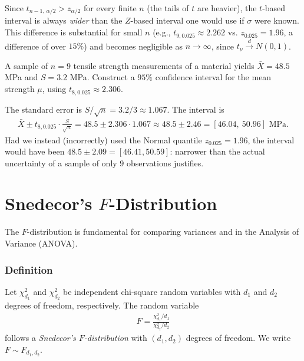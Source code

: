 \begin{observacion}
Since $t_{n-1,\,\alpha/2} > z_{\alpha/2}$ for every finite $n$ (the tails of $t$ are heavier), the $t$-based interval is always \emph{wider} than the $Z$-based interval one would use if $\sigma$ were known. This difference is substantial for small $n$ (e.g., $t_{9,0.025}\approx 2.262$ vs. $z_{0.025}=1.96$, a difference of over $15\%$) and becomes negligible as $n \to \infty$, since $t_\nu \xrightarrow{d} N(0,1)$.
\end{observacion}

\begin{ejemplo}
 \label{exmp:5.4.1}
A sample of $n=9$ tensile strength measurements of a material yields $\bar{X}=48.5$ MPa and $S=3.2$ MPa. Construct a $95\%$ confidence interval for the mean strength $\mu$, using $t_{8,0.025}\approx 2.306$.
\end{ejemplo}

\begin{solucion}
The standard error is $S/\sqrt{n} = 3.2/3 \approx 1.067$. The interval is
\begin{align}
 \bar{X} \pm t_{8,0.025}\cdot\frac{S}{\sqrt{n}} = 48.5 \pm 2.306\cdot 1.067
 \approx 48.5 \pm 2.46 = [46.04,\ 50.96] \text{ MPa}.
\end{align}
Had we instead (incorrectly) used the Normal quantile $z_{0.025}=1.96$, the interval would have been $48.5 \pm 2.09 = [46.41, 50.59]$: narrower than the actual uncertainty of a sample of only $9$ observations justifies.
\end{solucion}



\section{Snedecor's $F$-Distribution}

The $F$-distribution is fundamental for comparing variances and in the Analysis of Variance (ANOVA).

\subsubsection{Definition}

\begin{definicion}[$F$-Distribution]
Let $\chi^2_{d_1}$ and $\chi^2_{d_2}$ be independent chi-square random variables with $d_1$ and $d_2$ degrees of freedom, respectively. The random variable
\begin{align}
 \label{eq:3.2.15}
 F = \frac{\chi^2_{d_1}/d_1}{\chi^2_{d_2}/d_2}
\end{align}
follows a \emph{Snedecor's $F$-distribution} with $(d_1, d_2)$ degrees of freedom. We write $F \sim F_{d_1, d_2}$.
\end{definicion}

